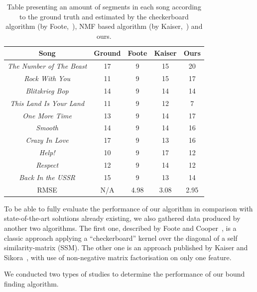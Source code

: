 \begin{table}
\begin{center}
\begin{tabular}{| c | c | c | c | c | } \hline 
Song  											& Ground	& Foote 	&  Kaiser 	& Ours \\ \hline \hline
\textit{The Number of The Beast} 	&	17			& 	9  			&  15 		&  20   	\\ \hline
\textit{Rock With You}						&	11			&  9			&  15 		& 17   	\\ \hline
\textit{Blitzkrieg Bop} 						&	14			&  9  			&  14 		& 14   	\\ \hline
\textit{This Land Is Your Land} 		&	11			&  9			&  12 		& 7    	\\ \hline
\textit{One More Time}					&	13			&  9    		&  14 		& 17   	\\ \hline
\textit{Smooth}								&	14			&  9  			&  14 		& 16  	\\ \hline
\textit{Crazy In Love}						&	17			&  9  			&  13  		& 16   	\\ \hline
\textit{Help!}									&	10			&  9		   	&  17 		& 12   	\\ \hline
\textit{Respect}								&	12			&  9  			&  14 		& 12  	\\ \hline
\textit{Back In the USSR}				&	15			&  9  			&  13		    	& 14		\\ \hline \hline
RMSE											&	N/A		& 4.98		&  3.08		& 2.95	\\ \hline 

\end{tabular}
\caption{Table presenting an amount of segments in each song according to the ground truth and estimated by the checkerboard algorithm (by Foote,~\cite{FooteCooper}), NMF based algorithm (by Kaiser,~\cite{Sikora}) and ours.}
\label{table:evalStructureCount}
\end{center}
\end{table}

To be able to fully evaluate the performance of our algorithm in comparison with state-of-the-art solutions already existing, we also gathered data produced by another two algorithms. The first one, described by Foote and Cooper~\cite{FooteCooper}, is a classic approach applying a ``checkerboard'' kernel over the diagonal of a self similarity-matrix (SSM). The other one is an approach published by Kaiser and Sikora~\cite{Sikora}, with use of non-negative matrix factorisation on only one feature. 

We conducted two types of studies to determine the performance of our bound finding algorithm.


